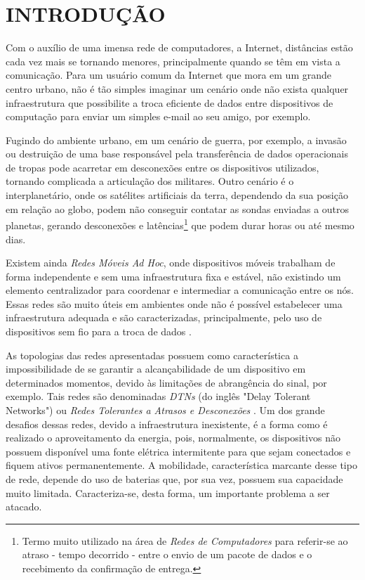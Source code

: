 \chapter{INTRODUÇÃO}

Com o auxílio de uma imensa rede de computadores, a Internet, distâncias estão cada vez mais se tornando menores, principalmente quando se têm em vista a comunicação. Para um usuário comum da Internet que mora em um grande centro urbano, não é tão simples imaginar um cenário onde não exista qualquer infraestrutura que possibilite a troca eficiente de dados entre dispositivos de computação para enviar um simples e-mail ao seu amigo, por exemplo.

Fugindo do ambiente urbano, em um cenário de guerra, por exemplo, a invasão ou destruição de uma base responsável pela transferência de dados operacionais de tropas pode acarretar em desconexões entre os dispositivos utilizados, tornando complicada a articulação dos militares.  Outro cenário é o interplanetário, onde os satélites artificiais da terra, dependendo da sua posição em relação ao globo, podem não conseguir contatar as sondas enviadas a outros planetas, gerando desconexões e latências\footnote{Termo muito utilizado na área de \emph{Redes de Computadores} para referir-se ao atraso - tempo decorrido - entre o envio de um pacote de dados e o recebimento da confirmação de entrega.} que podem durar horas ou até mesmo dias.

Existem ainda \emph{Redes Móveis Ad Hoc}, onde dispositivos móveis trabalham de forma independente e sem uma infraestrutura fixa e estável, não existindo um elemento centralizador para coordenar e intermediar a comunicação entre os nós. Essas redes são muito úteis em ambientes onde não é possível estabelecer uma infraestrutura adequada e são caracterizadas, principalmente, pelo uso de dispositivos sem fio para a troca de dados \cite{alves2009redes}.

As topologias das redes apresentadas possuem como característica a impossibilidade de se garantir a alcançabilidade de um dispositivo em determinados momentos, devido às limitações de abrangência do sinal, por exemplo. Tais redes são denominadas \emph{DTNs} (do inglês "Delay Tolerant Networks") ou \emph{Redes Tolerantes a Atrasos e Desconexões} \cite{alves2009redes}. Um dos grande desafios dessas redes, devido a infraestrutura inexistente, é a forma como é realizado o aproveitamento da energia, pois, normalmente, os dispositivos não possuem disponível uma fonte elétrica intermitente para que sejam conectados e fiquem ativos permanentemente. A mobilidade, característica marcante desse tipo de rede, depende do uso de baterias que, por sua vez, possuem sua capacidade muito limitada. Caracteriza-se, desta forma, um importante problema a ser atacado.

